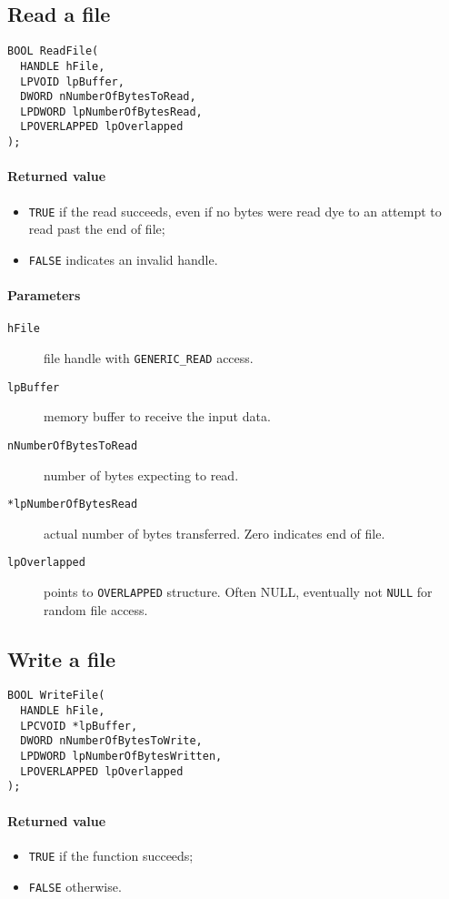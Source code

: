 \subsection{Read a file}
\begin{verbatim}
BOOL ReadFile(
  HANDLE hFile,
  LPVOID lpBuffer,
  DWORD nNumberOfBytesToRead,
  LPDWORD lpNumberOfBytesRead,
  LPOVERLAPPED lpOverlapped
);
\end{verbatim}

\paragraph{Returned value}
\begin{itemize}
\item \texttt{TRUE} if the read succeeds, even if no bytes were read dye to an attempt to read past the end of file;
\item \texttt{FALSE} indicates an invalid handle.
\end{itemize}

\paragraph{Parameters}
\label{par:read_parameters}
\begin{description}
\item [\texttt{hFile}] file handle with \texttt{GENERIC\_READ} access.
\item [\texttt{lpBuffer}] memory buffer to receive the input data.
\item [\texttt{nNumberOfBytesToRead}] number of bytes expecting to read.
\item [\texttt{*lpNumberOfBytesRead}] actual number of bytes transferred. Zero indicates end of file.
\item [\texttt{lpOverlapped}] points to \texttt{OVERLAPPED} structure. Often NULL, eventually not \texttt{NULL} for random file access.
\end{description}

\subsection{Write a file}
\begin{verbatim}
BOOL WriteFile(
  HANDLE hFile,
  LPCVOID *lpBuffer,
  DWORD nNumberOfBytesToWrite,
  LPDWORD lpNumberOfBytesWritten,
  LPOVERLAPPED lpOverlapped
);
\end{verbatim}

\paragraph{Returned value}
\begin{itemize}
\item \texttt{TRUE} if the function succeeds;
\item \texttt{FALSE} otherwise.
\end{itemize}

